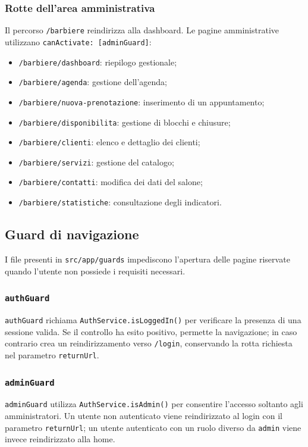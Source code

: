 \documentclass[12pt,a4paper]{article}
\begin{document}
\subsubsection{Rotte dell'area amministrativa}
Il percorso \texttt{/barbiere} reindirizza alla dashboard. Le pagine
amministrative utilizzano \texttt{canActivate: [adminGuard]}:
\begin{itemize}
    \item \texttt{/barbiere/dashboard}: riepilogo gestionale;
    \item \texttt{/barbiere/agenda}: gestione dell'agenda;
    \item \texttt{/barbiere/nuova-prenotazione}: inserimento di un appuntamento;
    \item \texttt{/barbiere/disponibilita}: gestione di blocchi e chiusure;
    \item \texttt{/barbiere/clienti}: elenco e dettaglio dei clienti;
    \item \texttt{/barbiere/servizi}: gestione del catalogo;
    \item \texttt{/barbiere/contatti}: modifica dei dati del salone;
    \item \texttt{/barbiere/statistiche}: consultazione degli indicatori.
\end{itemize}

\subsection{Guard di navigazione}
I file presenti in \texttt{src/app/guards} impediscono l'apertura delle pagine
riservate quando l'utente non possiede i requisiti necessari.

\subsubsection{\texttt{authGuard}}
\texttt{authGuard} richiama \texttt{AuthService.isLoggedIn()} per verificare
la presenza di una sessione valida. Se il controllo ha esito positivo,
permette la navigazione; in caso contrario crea un reindirizzamento verso
\texttt{/login}, conservando la rotta richiesta nel parametro
\texttt{returnUrl}.

\subsubsection{\texttt{adminGuard}}
\texttt{adminGuard} utilizza \texttt{AuthService.isAdmin()} per consentire
l'accesso soltanto agli amministratori. Un utente non autenticato viene
reindirizzato al login con il parametro \texttt{returnUrl}; un utente
autenticato con un ruolo diverso da \texttt{admin} viene invece reindirizzato
alla home.
\end{document}
